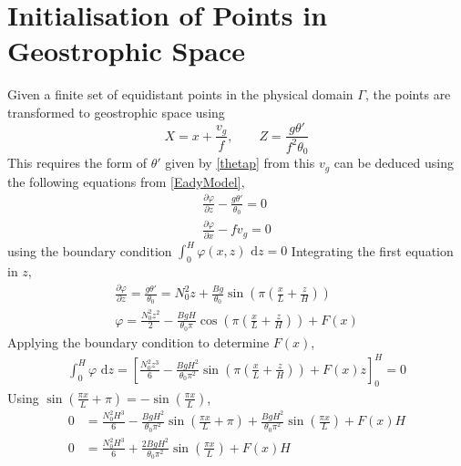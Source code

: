 \section{Initialisation of Points in Geostrophic Space \label{Initpoints}}
Given a finite set of equidistant points in the physical domain $\Gamma$, the points are transformed to geostrophic space using
\begin{equation}
X = x + \frac{v_g}{f}, \qquad Z = \frac{g\theta'}{f^2\theta_0}
\label{geostrophictransformation}
\end{equation}
This requires the form of $\theta'$ given by \ref{thetap} from this $v_g$ can be deduced using the following equations from \ref{EadyModel},
\begin{equation}
	\begin{aligned}
		\frac{\partial \varphi}{\partial z} - \frac{g \theta'}{\theta_0} = 0\\
		\frac{\partial \varphi}{\partial x} - fv_g = 0
	\end{aligned}
\label{findingvg}
\end{equation}
using the boundary condition $\int_{0}^{H}\varphi(x,z)\text{ d}z = 0$
Integrating the first equation in $z$,
\begin{equation*}
	\begin{aligned}
	\frac{\partial \varphi}{\partial z} = \frac{g \theta'}{\theta_0} = N_0^2z + \frac{Bg}{\theta_0}\sin\left(\pi\left(\frac{x}{L}+\frac{z}{H}\right) \right)\\
	\varphi = \frac{N_0^2z^2}{2} - \frac{BgH}{\theta_0\pi}\cos\left(\pi\left(\frac{x}{L}+\frac{z}{H}\right)\right) + F(x)
	\end{aligned}
\end{equation*}
Applying the boundary condition to determine $F(x)$,
\begin{equation*}
	\begin{aligned}
	\int_{0}^{H}\varphi \text{ d}z = \left[ \frac{N_0^2z^3}{6} - \frac{BgH^2}{\theta_0\pi^2}\sin\left(\pi\left(\frac{x}{L}+\frac{z}{H}\right) \right) + F(x)z\right]_{0}^{H} = 0
	\end{aligned}
\end{equation*}
Using $\sin\left(\frac{\pi x}{L}+\pi\right) = -\sin\left(\frac{\pi x}{L}\right)$,
\begin{equation*}
\begin{aligned}
 0 & =\frac{N_0^2H^3}{6} - \frac{BgH^2}{\theta_0\pi^2}\sin\left(\frac{\pi x}{L}+\pi\right)+ \frac{BgH^2}{\theta_0\pi^2}\sin\left(\frac{\pi x}{L}\right) + F(x)H\\
 0 & =\frac{N_0^2H^3}{6} + \frac{2BgH^2}{\theta_0\pi^2}\sin\left(\frac{\pi x}{L}\right) + F(x)H
\end{aligned}
\end{equation*}
